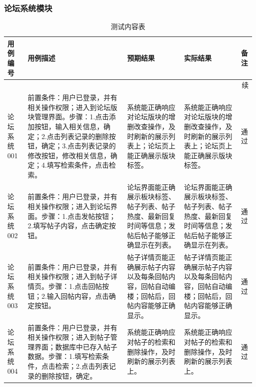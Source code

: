 \documentclass[titlepage,UTF8,linespread=1.5]{ctexart}
\begin{document}
\subsubsection{论坛系统模块}
\begin{longtable}{|p{4em}|p{14em}|p{7em}|p{7em}|p{2em}|}
    \caption{测试内容表}\label{tab:test_forum}  \\\hline
    用例编号    & 用例描述 & 预期结果 & 实际结果 & 备注 \\\hline
    \endfirsthead
    \multicolumn{5}{r}{{续\tablename\thetable{}}}       \\\hline
    \endhead
    论坛系统001 &
    前置条件：用户已登录，并有相关操作权限；进入到论坛版块管理界面。步骤：1.点击添加按钮，输入相关信息，确定；2.点击列表记录的删除按钮，确定；3.点击列表记录的修改按钮，修改相关信息，确定；4.填写检索条件，点击检索。 &
    系统能正确响应对论坛版块的增删改查操作，及时刷新的展示列表上；论坛页上能正确展示版块标签。 &
    系统能正确响应对论坛版块的增删改查操作，及时刷新的展示列表上；论坛页上能正确展示版块标签。 &
    通过 \\\hline
    论坛系统002 &
    前置条件：用户已登录，并有相关操作权限；进入到论坛界面。步骤：1.点击发帖按钮；2.填写帖子内容，点击确定按钮。 &
    论坛界面能正确展示板块标签、帖子列表、帖子热度、最新回复时间等信息；发帖后帖子能够正确显示在列表。 &
    论坛界面能正确展示板块标签、帖子列表、帖子热度、最新回复时间等信息；发帖后帖子能够正确显示在列表。 &
    通过 \\\hline
    论坛系统003 &
    前置条件：用户已登录，并有相关操作权限；进入到帖子详情页。步骤：1.点击回帖按钮；2.输入回帖内容，点击确定按钮。 &
    帖子详情页能正确展示帖子内容以及每条回帖内容，回帖自动编楼；回帖后，回帖内容能够正确显示。 &
    帖子详情页能正确展示帖子内容以及每条回帖内容，回帖自动编楼；回帖后，回帖内容能够正确显示。 &
    通过 \\\hline
    论坛系统004 &
    前置条件：用户已登录，并有相关操作权限；进入到帖子管理界面；数据库中已存入帖子数据。步骤：1.填写检索条件，点击检索；2.点击列表记录的删除按钮，确定。 &
    系统能正确响应对帖子的检索和删除操作，及时刷新的展示列表上。 &
    系统能正确响应对帖子的检索和删除操作，及时刷新的展示列表上。 &
    通过 \\\hline

\end{longtable}

\clearpage
\end{document}
